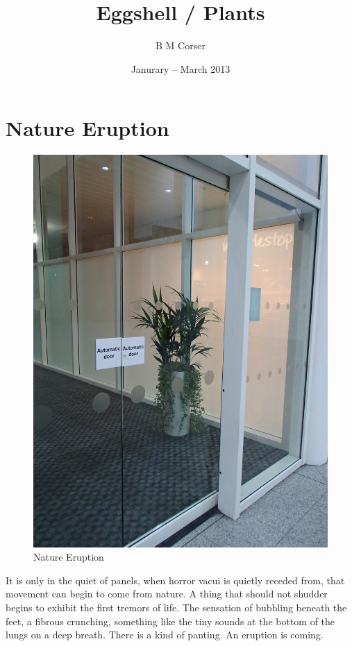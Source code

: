 \documentclass{book}
\title{Eggshell / Plants}
\author{B M Corser}
\date{Janurary -- March 2013}
\begin{document}
\maketitle

\tableofcontents

\chapter{Nature Eruption}

\begin{figure}
\centering
\includegraphics[width=\textwidth,angle=90]{figures/P1050140.JPG}
\caption{Nature Eruption}
\end{figure}

It is only in the quiet of panels, when horror vacui is quietly receded from,
that movement can begin to come from nature. A thing that should not shudder
begins to exhibit the first tremors of life. The sensation of bubbling beneath
the feet, a fibrous crunching, something like the tiny sounds at the bottom of
the lungs on a deep breath. There is a kind of panting. An eruption is coming.
\end{document}
